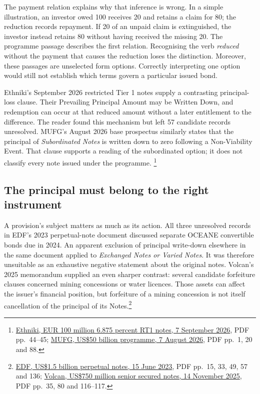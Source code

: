 The payment relation explains why that inference is wrong. In a simple
illustration, an investor owed 100 receives 20 and retains a claim for 80;
the reduction records repayment. If 20 of an unpaid claim is extinguished,
the investor instead retains 80 without having received the missing 20.
The programme passage describes the first relation. Recognising the verb
\emph{reduced} without the payment that causes the reduction loses the
distinction. Moreover, these passages are unselected form options.
Correctly interpreting one option would still not establish which terms
govern a particular issued bond.

Ethniki's September 2026 restricted Tier 1 notes supply a contrasting
principal-loss clause. Their Prevailing Principal Amount may be Written Down,
and redemption can occur at that reduced amount without a later entitlement
to the difference. The reader found this mechanism but left 57 candidate
records unresolved. MUFG's August 2026 base prospectus similarly states that
the principal of \emph{Subordinated Notes} is written down to zero following
a Non-Viability Event. That clause supports a reading of the subordinated
option; it does not classify every note issued under the programme.
\footnote{\href{../prospectus/difficulty-2026-10-04/pdfs/case-105585556.pdf}
{Ethniki, EUR 100 million 6.875 percent RT1 notes, 7 September 2026},
PDF pp.~44--45;
\href{../prospectus/difficulty-2026-10-04/pdfs/case-105541740.pdf}
{MUFG, US\$50 billion programme, 7 August 2026}, PDF pp.~1, 20 and 88.}

\subsection{The principal must belong to the right instrument}

A provision's subject matters as much as its action. All three unresolved
records in EDF's 2023 perpetual-note document discussed separate OCEANE
convertible bonds due in 2024. An apparent exclusion of principal write-down
elsewhere in the same document applied to \emph{Exchanged Notes or Varied
Notes}. It was therefore unsuitable as an exhaustive negative statement
about the original notes. Volcan's 2025 memorandum supplied an even sharper
contrast: several candidate forfeiture clauses concerned mining concessions
or water licences. Those assets can affect the issuer's financial position,
but forfeiture of a mining concession is not itself cancellation of the
principal of its Notes.\footnote{
\href{../prospectus/difficulty-2026-10-04/pdfs/case-103648885.pdf}
{EDF, US\$1.5 billion perpetual notes, 15 June 2023}, PDF pp.~15, 33, 49,
57 and 136;
\href{../prospectus/difficulty-2026-10-04/pdfs/case-105062309.pdf}
{Volcan, US\$750 million senior secured notes, 14 November 2025},
PDF pp.~35, 80 and 116--117.}

